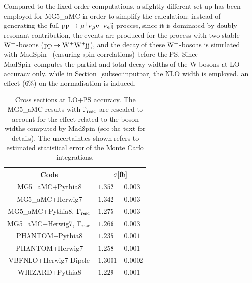 \documentclass[twocolumn,epjc3]{svjour3} %
\newlength{\width}
\begin{document}
Compared to the fixed order computations, a slightly different set-up has been employed for {\sc MG5\_aMC} in order to simplify the calculation: instead of generating the full
${\rm p}{\rm p}\to\mu^+\nu_\mu{\rm e}^+\nu_{\rm e}{\rm j}{\rm j}$ process, since it is dominated by doubly-resonant contribution, the
events are produced for the process with two stable ${\rm W}^+$-bosons (${\rm p}{\rm p}\to{\rm W^+}{\rm W^+}{\rm j}{\rm j}$), and the decay of these ${\rm W}^+$-bosons
is simulated with {\sc MadSpin}~\cite{Artoisenet:2012st} (ensuring spin correlations) before the PS. Since {\sc MadSpin}\ computes
the partial and total decay widths of the W bosons at LO accuracy only, while in Section~\ref{subsec:inputpar} the NLO width is employed,
an effect ($6\%$) on the normalisation is induced. 

\begin{table}[h!]
    \centering
    \begin{tabular}{c|l@{ $\pm$ }l}
      Code  &  \multicolumn{2}{c}{$\sigma[\rm{fb}]$}  \\
        \hline\hline
        {\sc MG5\_aMC}+{\sc Pythia8}&  $1.352 $ & $0.003$  \\
        {\sc MG5\_aMC}+{\sc Herwig7}&  $1.342 $ & $ 0.003$  \\
        {\sc MG5\_aMC}+{\sc Pythia8}, $\Gamma_{\rm resc}$&  $1.275$ & $0.003$  \\
        {\sc MG5\_aMC}+{\sc Herwig7}, $\Gamma_{\rm resc}$&  $1.266$ & $ 0.003$  \\
        {\sc PHANTOM}+{\sc Pythia8} &  $1.235 $ & $0.001$  \\
        {\sc PHANTOM}+{\sc Herwig7} &  $1.258 $ & $0.001$  \\
        {\sc VBFNLO}+{\sc Herwig7-Dipole} &  $1.3001$ & $0.0002$  \\
        {\sc WHIZARD}+{\sc Pythia8} &  $1.229$ & $0.001$  \\
    \end{tabular}
    \caption{\label{tab:PSratesLO} Cross sections at LO+PS accuracy.
    The {\sc MG5\_aMC} results with $\Gamma_{\rm resc}$
    are rescaled to account for the effect related to the boson widths computed by {\sc MadSpin} (see the text for details).
    The uncertainties shown refers to estimated statistical error of the Monte Carlo integrations.}
\end{table}
\end{document}
